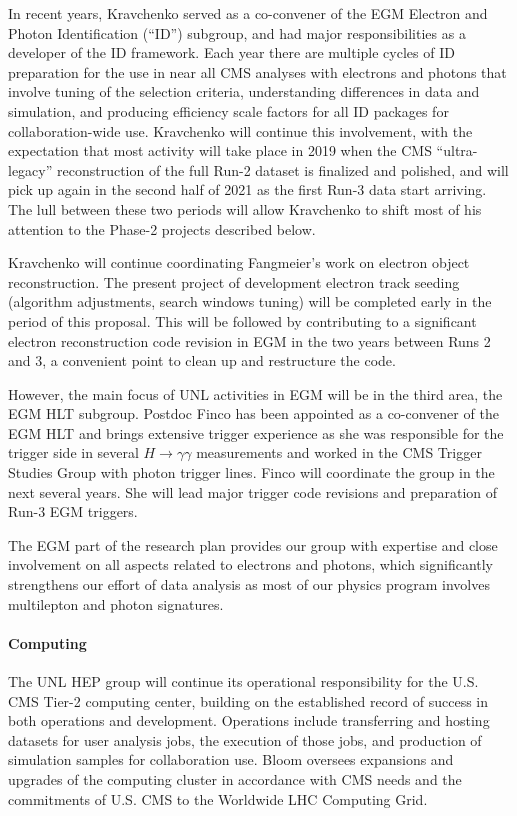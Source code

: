 In recent years, Kravchenko served as a co-convener of the EGM Electron and Photon Identification (``ID'') subgroup, and had major responsibilities as a developer of the ID framework. Each year there are multiple cycles of ID preparation for the use in near all CMS analyses with electrons and photons that involve tuning of the selection criteria, understanding differences in data and simulation, and producing efficiency scale factors for all ID packages for collaboration-wide use. Kravchenko will continue this involvement, with the expectation that most activity will take place in 2019 when the CMS ``ultra-legacy'' reconstruction of the full Run-2 dataset is finalized and polished, and will pick up again in the second half of 2021 as the first Run-3 data start arriving. The lull between these two periods will allow Kravchenko to shift most of his attention to the Phase-2 projects described below. 

Kravchenko will continue coordinating Fangmeier's work on electron object reconstruction. The present project of development electron track seeding (algorithm adjustments, search windows tuning) will be completed early in the period of this proposal. This will be followed by contributing to a significant electron reconstruction code revision in EGM in the two years between Runs 2 and 3, a convenient point to clean up and restructure the code.

However, the main focus of UNL activities in EGM will be in the third area, the EGM HLT subgroup. Postdoc Finco has been appointed as a co-convener of the EGM HLT and brings extensive trigger experience as she was responsible for the trigger side in several $H\to\gamma\gamma$ measurements and worked in the CMS Trigger Studies Group with photon trigger lines. Finco will coordinate the group in the next several years. She will lead major trigger code revisions and preparation of Run-3 EGM triggers.

The EGM part of the research plan provides our group with expertise and close involvement on all aspects related to electrons and photons, which significantly strengthens our effort of data analysis as most of our physics program involves multilepton and photon signatures.

\paragraph{Computing} The UNL HEP group will continue its operational responsibility for the U.S. CMS Tier-2 computing center, building on the established record of success in both operations and development. Operations include transferring and hosting datasets for user analysis jobs, the execution of those jobs, and production of simulation samples for collaboration use. Bloom oversees expansions and upgrades of the computing cluster in accordance with CMS needs and the commitments of U.S. CMS to the Worldwide LHC Computing Grid.

